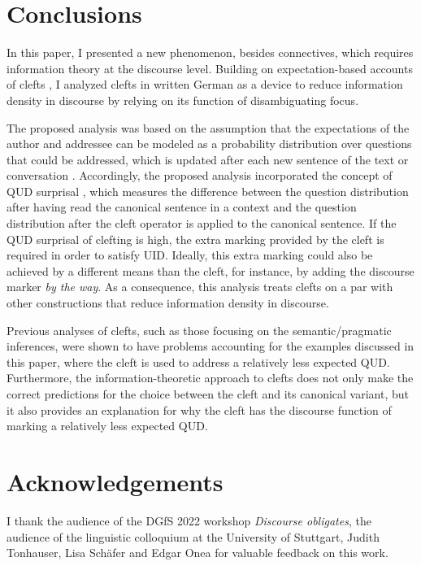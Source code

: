 \documentclass[output=paper,colorlinks,citecolor=brown]{langscibook}
\begin{document}
\section{Conclusions}\label{sec:6_conclusion}
 In this paper, I presented a new phenomenon, besides connectives, which requires information theory at the discourse level. Building on expectation-based accounts of clefts \citep[e.g.,][]{destruel_velleman_2014,tonnis_2021}, I analyzed clefts in written German as a device to reduce information density in discourse by relying on its function of disambiguating focus. 
 
The proposed analysis was based on the assumption that the expectations of the author and addressee can be modeled as a probability distribution over questions that could be addressed, which is updated after each new sentence of the text or conversation \citep[following][]{kehler_rohde_2017,tonnis_2021}. Accordingly, the proposed analysis incorporated the concept of QUD surprisal \citep[inspired by][]{demberg_keller_2008,asr_demberg_2015}, which measures the difference between the question distribution after having read the canonical sentence in a context and the question distribution after the cleft operator is applied to the canonical sentence. If the QUD surprisal of clefting is high, the extra marking provided by the cleft is required in order to satisfy UID. Ideally, this extra marking could also be achieved by a different means than the cleft, for instance, by adding the discourse marker \textit{by the way}. As a consequence, this analysis treats clefts on a par with other constructions that reduce information density in discourse. 
 
Previous analyses of clefts, such as those focusing on the semantic/pragmatic inferences, were shown to have problems accounting for the examples discussed in this paper, where the cleft is used to address a relatively less expected QUD. Furthermore, the information-theoretic approach to clefts does not only make the correct predictions for the choice between the cleft and its canonical variant, but it also provides an explanation for why the cleft has the discourse function of marking a relatively less expected QUD. 

\section*{Acknowledgements}
I thank the audience of the DGfS 2022 workshop \textit{Discourse obligates}, the audience of the linguistic colloquium at the University of Stuttgart, Judith Tonhauser, Lisa Sch\"afer and Edgar Onea for valuable feedback on this work.

\sloppy
\printbibliography[heading=subbibliography,notkeyword=this]
\end{document}
